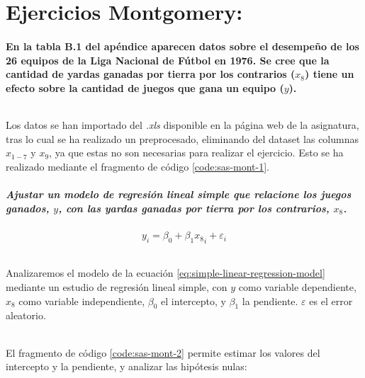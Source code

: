 \documentclass{article}
\begin{document}
  \part{Ejercicios Montgomery:}

  \setcounter{section}{2}
  \subsection{En la tabla B.1 del apéndice aparecen datos sobre el desempeño de los 26 equipos de la Liga Nacional de Fútbol en 1976. Se cree que la cantidad de yardas ganadas por tierra por los contrarios ($x_8$) tiene un efecto sobre la cantidad de juegos que gana un equipo ($y$).}
  \paragraph{}
  Los datos se han importado del \emph{.xls} disponible en la página web de la asignatura, tras lo cual se ha realizado un preprocesado, eliminando del dataset las columnas $x_{1-7}$ y $x_9$, ya que estas no son necesarias para realizar el ejercicio. Esto se ha realizado mediante el fragmento de código \ref{code:sas-mont-1}.

  \subsubsection{Ajustar un modelo de regresión lineal simple que relacione los juegos ganados, $y$, con las yardas ganadas por tierra por los contrarios, $x_8$.}

  \begin{equation}
  \label{eq:simple-linear-regression-model}
    y_i = \beta_0 + \beta_1{x_8}_i + \varepsilon_i
  \end{equation}
  \paragraph{}
  Analizaremos el modelo de la ecuación \ref{eq:simple-linear-regression-model} mediante un estudio de regresión lineal simple, con $y$ como variable dependiente, $x_8$ como variable independiente, $\beta_0$ el intercepto, y $\beta_1$ la pendiente. $\varepsilon$ es el error aleatorio.

  \paragraph{}
  El fragmento de código \ref{code:sas-mont-2} permite estimar los valores del intercepto y la pendiente, y analizar las hipótesis nulas:
\end{document}
